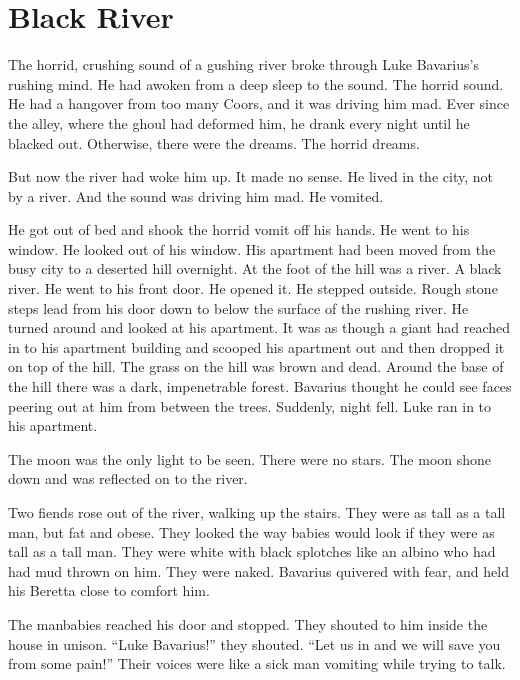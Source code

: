 \chapter{Black River}





\noindent The horrid, crushing sound of a gushing river broke through Luke
Bavarius's rushing mind. He had awoken from a deep sleep to the
sound. The horrid sound. He had a hangover from too many Coors, and
it was driving him mad. Ever since the alley, where the ghoul had
deformed him, he drank every night until he blacked out. Otherwise,
there were the dreams. The horrid dreams.

But now the river had woke him up. It made no sense. He lived in
the city, not by a river. And the sound was driving him mad. He
vomited.

He got out of bed and shook the horrid vomit off his hands. He went
to his window. He looked out of his window. His apartment had been
moved from the busy city to a deserted hill overnight. At the foot
of the hill was a river. A black river. He went to his front door.
He opened it. He stepped outside. Rough stone steps lead from his
door down to below the surface of the rushing river. He turned
around and looked at his apartment. It was as though a giant had
reached in to his apartment building and scooped his apartment out
and then dropped it on top of the hill. The grass on the hill was
brown and dead. Around the base of the hill there was a dark,
impenetrable forest. Bavarius thought he could see faces peering
out at him from between the trees. Suddenly, night fell. Luke ran
in to his apartment.

The moon was the only light to be seen. There were no stars. The
moon shone down and was reflected on to the river.

Two fiends rose out of the river, walking up the stairs. They were
as tall as a tall man, but fat and obese. They looked the way
babies would look if they were as tall as a tall man. They were
white with black splotches like an albino who had had mud thrown on
him. They were naked. Bavarius quivered with fear, and held his
Beretta close to comfort him.

The manbabies reached his door and stopped. They shouted to him
inside the house in unison. ``Luke Bavarius!'' they shouted. ``Let us
in and we will save you from some pain!'' Their voices were like a
sick man vomiting while trying to talk.

